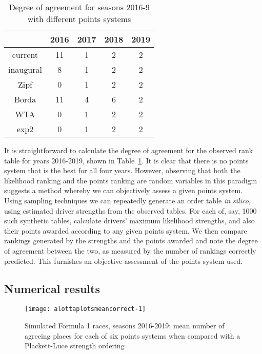 \documentclass{elsarticle}
\begin{document}
\begin{table}
\centering
\begin{tabular}{ |c|c|c|c|c|}
 \hline
         &    2016 & 2017 & 2018 & 2019\\ \hline
current  &    11   & 1    & 2    & 2   \\
inaugural&     8   & 1    & 2    & 2   \\
Zipf     &     0   & 1    & 2    & 2   \\
Borda    &    11   & 4    & 6    & 2   \\
WTA      &     0   & 1    & 2    & 2   \\
exp2     &     0   & 1    & 2    & 2   \\
 \hline
\end{tabular}
\caption{\doublespacing Degree of agreement for seasons 2016-9 with
  different \label{doapoints} points systems}
\end{table}


It is straightforward to calculate the degree of agreement for the
observed rank table for years 2016-2019, shown in
Table~\ref{doapoints}.  It is clear that there is no points system
that is the best for all four years.  However, observing that both the
likelihood ranking and the points ranking are random variables in this
paradigm suggests a method whereby we can objectively assess a given
points system.  Using sampling techniques we can repeatedly generate
an order table \emph{in silico}, using estimated driver strengths from
the observed tables.  For each of, say, 1000 such synthetic tables,
calculate drivers' maximum likelihood \citeauthor{plackett1975}
strengths, and also their points awarded according to any given points
system.  We then compare rankings generated by the
\citeauthor{plackett1975} strengths and the points awarded and note
the degree of agreement between the two, as measured by the number of
rankings correctly predicted.  This furnishes an objective assessment
of the points system used.

\subsection{Numerical results}\label{numerical-results}

\begin{figure}
{\centering \texttt{[image: alottaplotsmeancorrect-1]}}
\caption[\doublespacing Simulated Formula 1 races, seasons
  2016-2019]{\doublespacing Simulated Formula 1 races, seasons
  2016-2019: mean number of agreeing places for each of six
  points \label{simulated_mean} systems when compared with a
  Plackett-Luce strength ordering}\label{fig:alottaplotsmeancorrect}
\end{figure}
\end{document}
